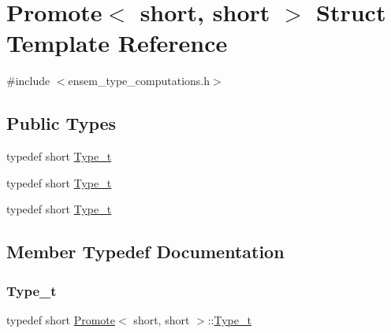 \hypertarget{structPromote_3_01short_00_01short_01_4}{}\section{Promote$<$ short, short $>$ Struct Template Reference}
\label{structPromote_3_01short_00_01short_01_4}


{\ttfamily \#include $<$ensem\+\_\+type\+\_\+computations.\+h$>$}

\subsection*{Public Types}
\begin{DoxyCompactItemize}
\item 
typedef short \mbox{\hyperlink{structPromote_3_01short_00_01short_01_4_a7be01cb6c481989a8d153e69778ac59a}{Type\+\_\+t}}
\item 
typedef short \mbox{\hyperlink{structPromote_3_01short_00_01short_01_4_a7be01cb6c481989a8d153e69778ac59a}{Type\+\_\+t}}
\item 
typedef short \mbox{\hyperlink{structPromote_3_01short_00_01short_01_4_a7be01cb6c481989a8d153e69778ac59a}{Type\+\_\+t}}
\end{DoxyCompactItemize}


\subsection{Member Typedef Documentation}
\mbox{\label{structPromote_3_01short_00_01short_01_4_a7be01cb6c481989a8d153e69778ac59a}} 
\subsubsection{\texorpdfstring{Type\_t}{Type\_t}\hspace{0.1cm}{\footnotesize\ttfamily [1/3]}}
{\footnotesize\ttfamily typedef short \mbox{\hyperlink{structPromote}{Promote}}$<$ short, short $>$\+::\mbox{\hyperlink{structPromote_3_01short_00_01short_01_4_a7be01cb6c481989a8d153e69778ac59a}{Type\+\_\+t}}}

\mbox{\label{structPromote_3_01short_00_01short_01_4_a7be01cb6c481989a8d153e69778ac59a}} 
